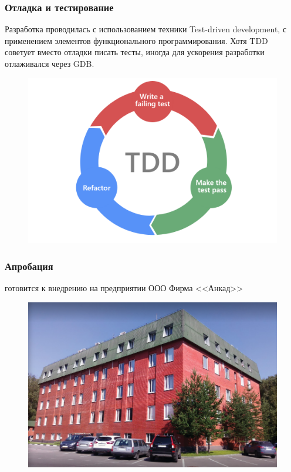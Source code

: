 \begin{frame}%
\frametitle{Отладка и тестирование {\ProgModule}}
    Разработка {\ProgModule} проводилась с использованием техники Test-driven development,
    с применением элементов функционального программирования. Хотя TDD советует вместо
    отладки писать тесты, иногда для ускорения разработки {\ProgModule} отлаживался через
    GDB.
    \begin{figure}[!htbp]
        \begin{adjustbox}{max totalsize={0.8\textwidth}{0.8\textheight}}
            \includegraphics[width=\linewidth]{images/TDD.png}
        \end{adjustbox}
    \end{figure}

\end{frame}

\begin{frame}%
\frametitle{Апробация}
    {\ProgModule} готовится к внедрению на предприятии ООО Фирма <<Анкад>>
    \begin{figure}[!htbp]
        \includegraphics[width=\textwidth,height=\textheight,keepaspectratio]{images/Ancud.png}
    \end{figure}
\end{frame}


